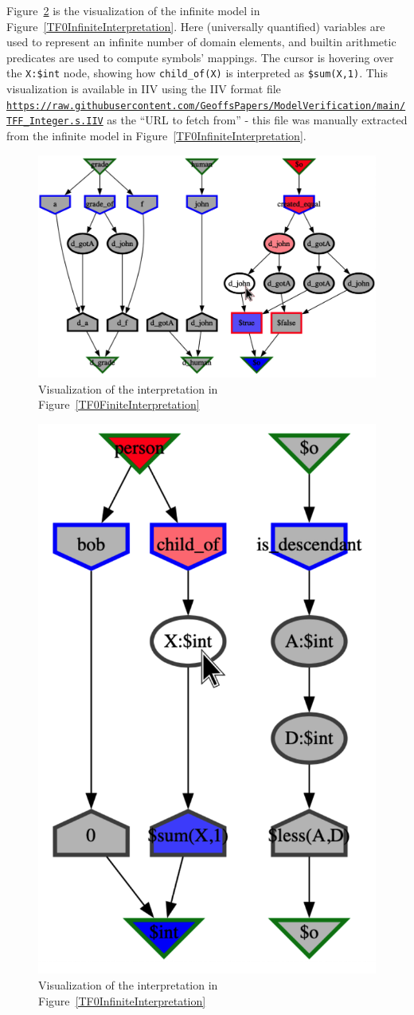 \documentclass[letterpaper]{article}
\newcommand{\smalltt}[1]{\small \texttt{#1}}
\begin{document}
Figure~\ref{TF0InfiniteIIV} is the visualization of the infinite model in 
Figure~\ref{TF0InfiniteInterpretation}. 
Here (universally quantified) variables are used to represent an infinite number of
domain elements, and builtin arithmetic predicates are used to compute symbols' mappings.
The cursor is hovering over the {\smalltt{X:\$int}} node, showing how 
{\smalltt{child\_of(X)}} is interpreted as {\smalltt{\$sum(X,1)}}.
This visualization is available in IIV using the IIV format file
{\smalltt{\url{https://raw.githubusercontent.com/GeoffsPapers/ModelVerification/main/TFF_Integer.s.IIV}}}
as the ``URL to fetch from'' - this file was manually extracted from the infinite model in 
Figure~\ref{TF0InfiniteInterpretation}.

\begin{figure}[htbp]
\centering
\includegraphics[width=\columnwidth]{TFF_Finite.s.IIV.pdf}
\caption{Visualization of the interpretation in Figure~\ref{TF0FiniteInterpretation}}
\label{TF0FiniteIIV}
\end{figure}

\begin{figure}[htbp]
\centering
\includegraphics[width=0.45\columnwidth]{TFF_Integer.s.IIV.pdf}
\caption{Visualization of the interpretation in Figure~\ref{TF0InfiniteInterpretation}}
\label{TF0InfiniteIIV}
\end{figure}
\end{document}
